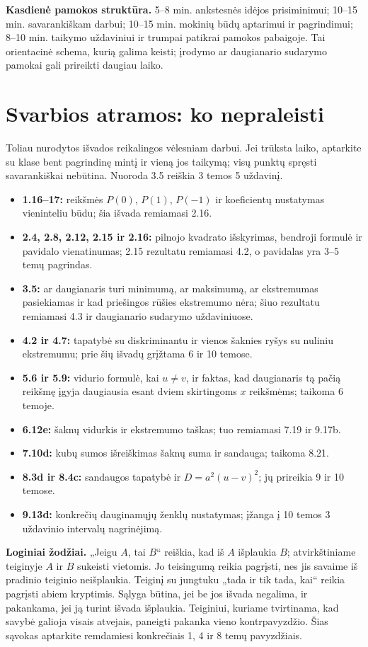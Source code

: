 \documentclass[11pt,a4paper]{article}
\begin{document}
\textbf{Kasdienė pamokos struktūra.} 5–8 min. ankstesnės idėjos prisiminimui; 10–15 min. savarankiškam darbui; 10–15 min. mokinių būdų aptarimui ir pagrindimui; 8–10 min. taikymo uždaviniui ir trumpai patikrai pamokos pabaigoje. Tai orientacinė schema, kurią galima keisti; įrodymo ar daugianario sudarymo pamokai gali prireikti daugiau laiko.
\section*{Svarbios atramos: ko nepraleisti}
Toliau nurodytos išvados reikalingos vėlesniam darbui. Jei trūksta laiko, aptarkite su klase bent pagrindinę mintį ir vieną jos taikymą; visų punktų spręsti savarankiškai nebūtina. Nuoroda 3.5 reiškia 3 temos 5 uždavinį.
\begin{itemize}
\item \textbf{1.16–17:} reikšmės $P(0)$, $P(1)$, $P(-1)$ ir koeficientų nustatymas vieninteliu būdu; šia išvada remiamasi 2.16.
\item \textbf{2.4, 2.8, 2.12, 2.15 ir 2.16:} pilnojo kvadrato išskyrimas, bendroji formulė ir pavidalo vienatinumas; 2.15 rezultatu remiamasi 4.2, o pavidalas yra 3–5 temų pagrindas.
\item \textbf{3.5:} ar daugianaris turi minimumą, ar maksimumą, ar ekstremumas pasiekiamas ir kad priešingos rūšies ekstremumo nėra; šiuo rezultatu remiamasi 4.3 ir daugianario sudarymo uždaviniuose.
\item \textbf{4.2 ir 4.7:} tapatybė su diskriminantu ir vienos šaknies ryšys su nuliniu ekstremumu; prie šių išvadų grįžtama 6 ir 10 temose.
\item \textbf{5.6 ir 5.9:} vidurio formulė, kai $u\ne v$, ir faktas, kad daugianaris tą pačią reikšmę įgyja daugiausia esant dviem skirtingoms $x$ reikšmėms; taikoma 6 temoje.
\item \textbf{6.12e:} šaknų vidurkis ir ekstremumo taškas; tuo remiamasi 7.19 ir 9.17b.
\item \textbf{7.10d:} kubų sumos išreiškimas šaknų suma ir sandauga; taikoma 8.21.
\item \textbf{8.3d ir 8.4c:} sandaugos tapatybė ir $D=a^2(u-v)^2$; jų prireikia 9 ir 10 temose.
\item \textbf{9.13d:} konkrečių dauginamųjų ženklų nustatymas; įžanga į 10 temos 3 uždavinio intervalų nagrinėjimą.
\end{itemize}
\textbf{Loginiai žodžiai.} „Jeigu $A$, tai $B$“ reiškia, kad iš $A$ išplaukia $B$; atvirkštiniame teiginyje $A$ ir $B$ sukeisti vietomis. Jo teisingumą reikia pagrįsti, nes jis savaime iš pradinio teiginio neišplaukia. Teiginį su jungtuku „tada ir tik tada, kai“ reikia pagrįsti abiem kryptimis. Sąlyga būtina, jei be jos išvada negalima, ir pakankama, jei ją turint išvada išplaukia. Teiginiui, kuriame tvirtinama, kad savybė galioja visais atvejais, paneigti pakanka vieno kontrpavyzdžio. Šias sąvokas aptarkite remdamiesi konkrečiais 1, 4 ir 8 temų pavyzdžiais.
\end{document}
